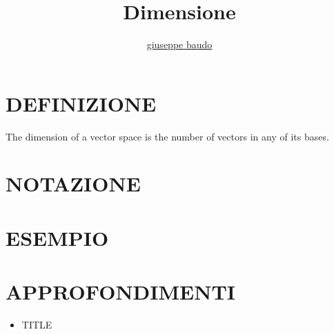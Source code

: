 \documentclass[a4paper,10pt]{article}
\title{Dimensione}
\author{\href{http://www.baudo.hol.es}{giuseppe baudo}}
\begin{document}
\maketitle

\section{DEFINIZIONE}
The dimension of a vector space is the number of vectors in any of its bases.

\section{NOTAZIONE}

\section{ESEMPIO}

\section{APPROFONDIMENTI}
\begin{itemize}
 \item TITLE
\end{itemize}
\end{document}
